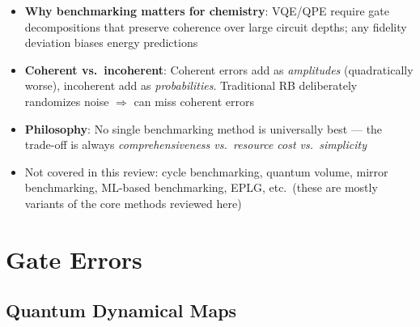 \documentclass[10pt,a4paper]{article}
\begin{document}
\begin{insightbox}
\begin{itemize}
  \item \textbf{Why benchmarking matters for chemistry}: VQE/QPE require gate decompositions that preserve coherence over large circuit depths; any fidelity deviation biases energy predictions
  \item \textbf{Coherent vs.\ incoherent}: Coherent errors add as \emph{amplitudes} (quadratically worse), incoherent add as \emph{probabilities}. Traditional RB deliberately randomizes noise $\Rightarrow$ can miss coherent errors
  \item \textbf{Philosophy}: No single benchmarking method is universally best --- the trade-off is always \emph{comprehensiveness vs.\ resource cost vs.\ simplicity}
  \item Not covered in this review: cycle benchmarking, quantum volume, mirror benchmarking, ML-based benchmarking, EPLG, etc.\ (these are mostly variants of the core methods reviewed here)
\end{itemize}
\end{insightbox}

\newpage

\section{Gate Errors}

\subsection{Quantum Dynamical Maps}
\end{document}
